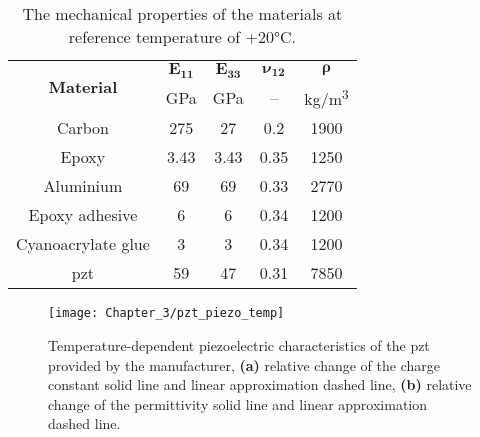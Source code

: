 \begin{table}[H]
	\small
	\tabcolsep=0.5cm
	\centering
	\caption{\label{tab:properties}The mechanical properties of the materials at reference temperature of +20\unit{\degreeCelsius}.}
	\begin{tabular}{ccccc}\toprule
		\multirow{2}{*}{\textbf{Material}} & $\boldsymbol{E_{11}}$ & $\boldsymbol{E_{33}}$ & $\boldsymbol{\nu_{12}}$ & $\boldsymbol{\rho}$ \\ & \unit{\giga\pascal} & \unit{\giga\pascal} & -- & \unit[per-mode = symbol]{\kilogram\per\cubic\meter}\\
		\midrule
		Carbon & 275 & 27 & 0.2 & 1900\\
		Epoxy & 3.43 & 3.43 & 0.35 & 1250\\
		Aluminium & 69 & 69 & 0.33 & 2770\\
		Epoxy adhesive & 6 & 6 & 0.34 & 1200\\
		Cyanoacrylate glue & 3 & 3 & 0.34 & 1200\\	
		\ac{pzt} &  59 & 47 & 0.31 & 7850\\
		\bottomrule
	\end{tabular}
\end{table}

\begin{figure}
	\begin{center}
		\texttt{[image: Chapter\_3/pzt\_piezo\_temp]}
	\end{center}
	\caption{Temperature-dependent piezoelectric characteristics of the \acf{pzt} provided by the manufacturer, \textbf{(a)} relative change of the charge constant solid line and linear approximation dashed line, \textbf{(b)} relative change of the permittivity solid line and linear approximation dashed line.}
	\label{fig:pzt_manuf}
\end{figure}

